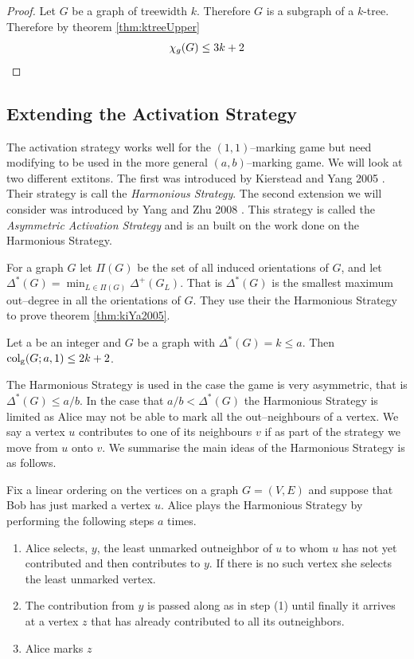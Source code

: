 \begin{proof}
    Let $G$ be a graph of treewidth $k$.
    Therefore $G$ is a subgraph of a $k$-tree. Therefore by theorem \ref{thm:ktreeUpper} \[\chi_g(G) \leq 3k + 2 \qedhere\] 
\end{proof}

\subsection{Extending the Activation Strategy}

The activation strategy works well for the $(1,1)$--marking game but need modifying to be used in the more general $(a,b)$--marking game. We will look at two different extitons. The first was introduced by Kierstead and Yang 2005 \cite{kierYang2005}. Their strategy is call the \textit{Harmonious Strategy}. The second extension we will consider was introduced by Yang and Zhu 2008 \cite{yangZhu2008}. This strategy is called the \textit{Asymmetric Activation Strategy} and is an built on the work done on the Harmonious Strategy. 

For a graph $G$ let $\Pi(G)$ be the set of all induced orientations of $G$, and let $\Delta^*(G)=\min_{L\in \Pi(G)}\Delta^+(G_L)$. That is $\Delta^*(G)$ is the smallest maximum out--degree in all the orientations of $G$. They use their the Harmonious Strategy to prove theorem \ref{thm:kiYa2005}.

\begin{theorem}\label{thm:kiYa2005}
    Let a be an integer and $G$ be a graph with $\Delta^*(G) = k\leq a$. Then
    $\operatorname{col_g}(G;a,1) \leq 2k + 2$.
\end{theorem}

The Harmonious Strategy is used in the case the game is very asymmetric, that is $\Delta^*(G)\leq a/b$. In the case that $a/b < \Delta^*(G)$ the Harmonious Strategy is limited as Alice may not be able to mark all the out--neighbours of a vertex. We say a vertex $u$ contributes to one of its neighbours $v$ if as part of the strategy we move from $u$ onto $v$. We summarise the main ideas of the Harmonious Strategy is as follows. 

Fix a linear ordering on the vertices on a graph $G=(V,E)$ and suppose that Bob has just marked a vertex $u$. Alice plays the Harmonious Strategy by performing the following steps $a$ times.    
\begin{enumerate}
    \item  Alice selects, $y$, the least unmarked outneighbor of $u$ to whom $u$ has not yet contributed and then contributes to $y$. If there is no such vertex she selects the least unmarked vertex.
    \item  The contribution from $y$
    is passed along as in step (1) until finally it arrives at a vertex $z$ that has already contributed to all its outneighbors.
    \item  Alice marks $z$
\end{enumerate}

